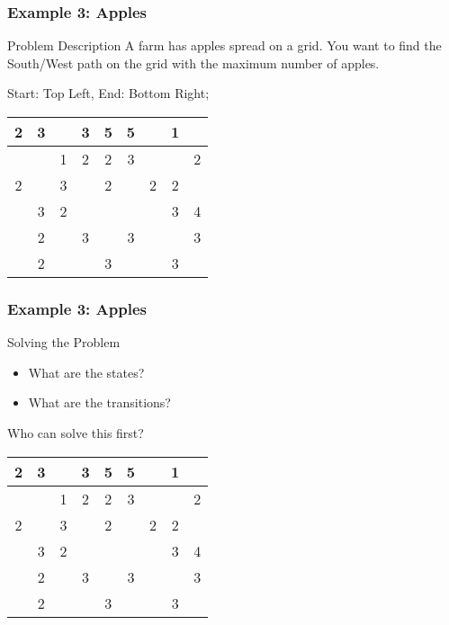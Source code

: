 \documentclass{beamer}
\begin{document}
\begin{frame}
  \frametitle{Example 3: Apples}
  \begin{block}{Problem Description}
    A farm has apples spread on a grid. You want to find the
    South/West path on the grid with the maximum number of apples.
    \medskip
    
    Start: Top Left, End: Bottom Right;
  \end{block}
  
  \begin{center}
    \begin{tabular}{|c|c|c|c|c|c|c|c|c|}
      \hline
      2 & 3 & & 3 & 5 & 5 & & 1 & \\
      \hline
       & & 1 & 2 & 2 & 3 & & & 2 \\
      \hline
      2 & & 3 & & 2 & & 2 & 2 & \\
      \hline
       & 3 & 2 & & & & & 3 & 4 \\
      \hline
       & 2 & & 3 & & 3 & & & 3\\
      \hline
       & 2 & & & 3 & & & 3 & \\
      \hline      
    \end{tabular}
  \end{center}
\end{frame}

\begin{frame}
  \frametitle{Example 3: Apples}
  \begin{block}{Solving the Problem}
    \begin{itemize}
    \item What are the states?
    \item What are the transitions?
    \end{itemize}
  \end{block}
  \medskip
  
  Who can solve this first?\\
  \begin{center}
    \begin{tabular}{|c|c|c|c|c|c|c|c|c|}
      \hline
      2 & 3 & & 3 & 5 & 5 & & 1 & \\
      \hline
       & & 1 & 2 & 2 & 3 & & & 2 \\
      \hline
      2 & & 3 & & 2 & & 2 & 2 & \\
      \hline
       & 3 & 2 & & & & & 3 & 4 \\
      \hline
       & 2 & & 3 & & 3 & & & 3\\
      \hline
       & 2 & & & 3 & & & 3 & \\
      \hline      
    \end{tabular}
  \end{center}
\end{frame}
\end{document}

